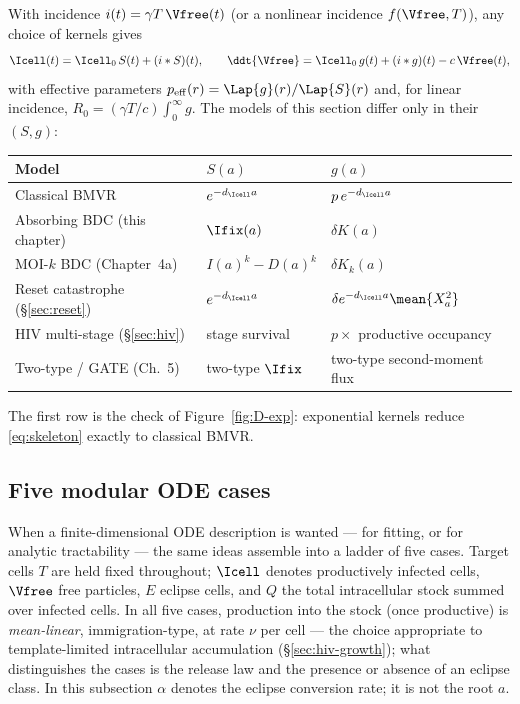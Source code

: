 With incidence $i(t)=\gamma T\,\Vfree(t)$ (or a nonlinear incidence
$f(\Vfree,T)$), any choice of kernels gives
\begin{equation}
\Icell(t)=\Icell_0\,S(t)+(i*S)(t),
\qquad
\ddt{\Vfree}=\Icell_0\,g(t)+(i*g)(t)-c\,\Vfree(t),
\label{eq:skeleton}
\end{equation}
with effective parameters $p_{\rm eff}(r)=\Lap{g}(r)/\Lap{S}(r)$ and, for
linear incidence, $R_0=(\gamma T/c)\int_0^\infty g$. The models of this
section differ only in their $(S,g)$:
\begin{center}
\renewcommand{\arraystretch}{1.2}
\small
\begin{tabular}{@{}lll@{}}
\toprule
Model & $S(a)$ & $g(a)$ \\
\midrule
Classical BMVR & $e^{-d_{\Icell} a}$ & $p\,e^{-d_{\Icell} a}$ \\
Absorbing BDC (this chapter) & $\Ifix(a)$ & $\delta K(a)$ \\
MOI-$k$ BDC (Chapter~4a) & $I(a)^k-D(a)^k$ & $\delta K_k(a)$ \\
Reset catastrophe (\S\ref{sec:reset}) & $e^{-d_{\Icell} a}$ & $\delta e^{-d_{\Icell}a}\mean{X_a^2}$ \\
HIV multi-stage (\S\ref{sec:hiv}) & stage survival & $p\times$ productive occupancy \\
Two-type / GATE (Ch.~5) & two-type $\Ifix$ & two-type second-moment flux \\
\bottomrule
\end{tabular}
\end{center}
The first row is the check of Figure~\ref{fig:D-exp}: exponential kernels
reduce \eqref{eq:skeleton} exactly to classical BMVR.

\subsection{Five modular ODE cases}
\label{sec:five-cases}

When a finite-dimensional ODE description is wanted --- for fitting, or for
analytic tractability --- the same ideas assemble into a ladder of five
cases. Target cells $T$ are held fixed throughout; $\Icell$ denotes
productively infected cells, $\Vfree$ free particles, $E$ eclipse cells,
and $Q$ the total intracellular stock summed over infected cells. In all
five cases, production into the stock (once productive) is
\emph{mean-linear}, immigration-type, at rate $\nu$ per cell --- the choice
appropriate to template-limited intracellular accumulation
(\S\ref{sec:hiv-growth}); what distinguishes the cases is the release law
and the presence or absence of an eclipse class. In this subsection
$\alpha$ denotes the eclipse conversion rate; it is not the root $a$.

